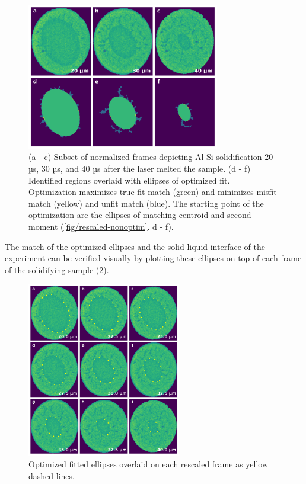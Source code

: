 \begin{figure}[ht]
    \centering
    \includegraphics[width=0.75\textwidth]{figures/04/10-rescaled-optim-fit.png}
    \caption{
        \small{}
        (a - c) Subset of normalized frames depicting Al-Si solidification
        20 µs, 30 µs, and 40 µs after the laser melted the sample.
        (d - f) Identified regions overlaid with ellipses of optimized
        fit. Optimization maximizes true fit match (green) and minimizes
        misfit match (yellow) and unfit match (blue). The
        starting point of the optimization are the ellipses of matching
        centroid and second moment (\ref{fig/rescaled-nonoptim}. d - f).
    }
    \label{fig/rescaled-optim}
\end{figure}

The match of the optimized ellipses and the solid-liquid interface of the
experiment can be verified visually by plotting these ellipses on top of
each frame of the solidifying sample (\ref{fig/optim-ellipses}).

\begin{figure}[ht]
    \centering
    \includegraphics[width=0.6\textwidth]{figures/04/11-rescaled-optim-ellipses.png}
    \caption{
        \small{}
        Optimized fitted ellipses overlaid on each rescaled frame as yellow
        dashed lines.
    }
    \label{fig/optim-ellipses}
\end{figure}

